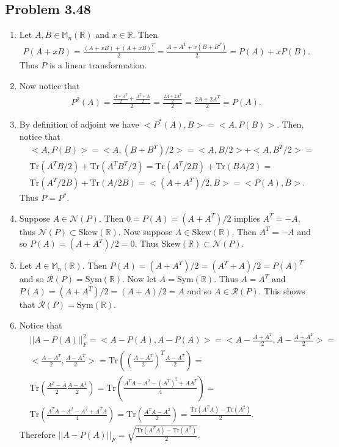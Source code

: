 \documentclass[letterpaper,12pt]{article}
\theoremstyle{definition}
\begin{document}
\begin{spacing}{1.3}{}
	
\subsection*{Problem 3.48}
\begin{enumerate}
  \item 
  Let $A,B\in\mathbb M_n(\mathbb R)$ and $x\in\mathbb R$.
	Then
	\begin{align*}
	P(A+xB)=\frac{(A+xB)+(A+xB)^T}{2}=
	\frac{A+A^T+x(B+B^T)}{2}=P(A)+xP(B).
	\end{align*}
	Thus $P$ is a linear transformation.
	\item
		Now notice that
	\begin{align*}
	P^2(A)=\frac{\frac{A+A^T}{2}+\frac{A^T+A}{2}}{2}=
	\frac{\frac{2A+2A^T}{2}}{2}=\frac{2A+2A^T}{2}=P(A).
	\end{align*}
	\item
		By definition of adjoint we have $<P^*(A),B>=<A,P(B)>$.
	Then, notice that
	\begin{align*}
	&<A,P(B)>=<A,(B+B^T)/2>=
	<A,B/2>+<A,B^T/2>=\\
	&\text{Tr}(A^TB/2)+\text{Tr}(A^TB^T/2)=
	\text{Tr}(A^T/2B)+\text{Tr}(BA/2)=\\
	&\text{Tr}(A^T/2B)+\text{Tr}(A/2B)=
	<(A+A^T)/2,B>=<P(A),B>.
	\end{align*}
	Thus $P=P^*$.
	\item
		Suppose $A\in\mathcal N(P)$.
	Then $0=P(A)=(A+A^T)/2$ implies $A^T=-A$, thus $\mathcal N(P)\subset\text{Skew}(\mathbb R)$.
	Now suppose $A\in\text{Skew}(\mathbb R)$.
	Then $A^T=-A$ and so $P(A)=(A+A^T)/2=0$. Thus $\text{Skew}(\mathbb R)\subset\mathcal N(P)$.
	\item
	Let $A\in\mathbb M_n(\mathbb R)$.
	Then $P(A)=(A+A^T)/2=(A^T+A)/2=P(A)^T$ and so $\mathcal R(P)=\text{Sym}(\mathbb R)$.
	Now let $A=\text{Sym}(\mathbb R)$.
	Thus $A=A^T$ and $P(A)=(A+A^T)/2=(A+A)/2=A$ and so $A\in\mathcal R(P)$.
	This shows that $\mathcal R(P)=\text{Sym}(\mathbb R)$.
	\item
	Notice that
	\begin{align*}
	&||A - P(A)||_F^2 = <A - P(A), A - P(A)> =
	<A - \frac{A + A^T}{2}, A - \frac{A + A^T}{2}> =\\
	&<\frac{A - A^T}{2}, \frac{A - A^T}{2}> =
	\text{Tr}\left(\left(\frac{A - A^T}{2}\right)^T\frac{A - A^T}{2}\right)=\\
	&\text{Tr}\left(\frac{A^T - A}{2}\frac{A - A^T}{2}\right) =
	\text{Tr}\left(\frac{A^TA - A^2 - (A^T)^2 + AA^T}{4}\right) =\\
	&\text{Tr}\left(\frac{A^TA - A^2 - A^2 + A^TA}{4}\right) =
	\text{Tr}\left(\frac{A^TA - A^2}{2}\right) =
	\frac{\text{Tr}(A^TA) - \text{Tr}(A^2)}{2}.
	\end{align*}
	Therefore $||A - P(A)||_F = \sqrt{\frac{\text{Tr}(A^TA) - \text{Tr}(A^2)}{2}}$. \\


\end{enumerate}
\end{spacing}
\end{document}
